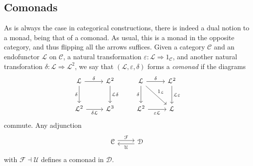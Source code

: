 \subsection{Comonads}

As is always the case in categorical constructions, there is indeed a dual notion to a monad, being that of a comonad. As usual, this is a monad in the opposite category, and thus flipping all the arrows suffices. Given a category $\mathcal{C} $ and an endofunctor $\mathcal{L} $ on $\mathcal{C} $, a natural transformation $\varepsilon : \mathcal{L}  \Rightarrow 1_{\mathcal{C} } $, and another natural transforation $\delta : \mathcal{L}  \Rightarrow \mathcal{L} ^2$, we say that $(\mathcal{L} ,\varepsilon ,\delta )$ forms a \emph{comonad} if the diagrams
\[\begin{tikzcd}[row sep = 2.5em, column sep = 2.5em]
	\mathcal{L} \ar[" \delta  ", r] \ar[" \delta  "', d]  & \mathcal{L} ^2\ar[" \mathcal{L} \delta  ", d]  & \mathcal{L} \ar[" \delta  ", r] \ar[" \delta  "', d]  \ar[" 1_\mathcal{L}  ", dr]& \mathcal{L} ^2\ar[" \mathcal{L} \varepsilon  ", d]  \\
\mathcal{L} ^2\ar[" \delta \mathcal{L}  "', r]  & \mathcal{L} ^3 & \mathcal{L} ^2\ar[" \varepsilon \mathcal{L}  "', r]  & \mathcal{L} 
\end{tikzcd}\]
commute. Any adjunction
\[\begin{tikzcd}[row sep = 2.5em, column sep = 2.5em]
\mathcal{C} \ar[" \mathcal{F}  ", shift left, r]  & \mathcal{D} \ar[" \mathcal{U}  ", shift left, l] 
\end{tikzcd}\]
with $\mathcal{F} \dashv \mathcal{U} $ defines a comonad in $\mathcal{D} $.
